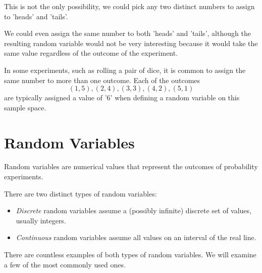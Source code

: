 \par\vspace{0.5 cm}
This is not the only possibility, we could pick any two distinct numbers to assign to 'heads' and 'tails'.  
\par\vspace{0.5 cm}
We could even assign the same number to both 'heads' and 'tails', although the resulting random variable would not be very interesting because it would take the same value regardless of the outcome of the experiment.
\par\vspace{0.5 cm}
In some experiments, such as rolling a pair of dice, it is common to assign the same number to more than one outcome.  Each of the outcomes
\[
(1,5),(2,4),(3,3),(4,2),(5,1)
\]
are typically assigned a value of '6' when defining a random variable on this sample space.
\section{Random Variables}
Random variables are numerical values that represent the outcomes of probability experiments.
\par\vspace{0.5 cm}
There are two distinct types of random variables:
\par\vspace{0.5 cm}
\begin{itemize}
\item \textit{Discrete} random variables assume a (possibly infinite) discrete set of values, usually integers.
\item \textit{Continuous} random variables assume all values on an interval of the real line.
\end{itemize}
\par\vspace{0.5 cm}
There are countless examples of both types of random variables.  We will examine a few of the most commonly used ones.
